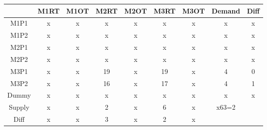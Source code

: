\documentclass{article}%
\begin{document}
\begin{tabular}{c|cc|c|ccccc}
    & M1RT & M1OT & M2RT & M2OT & M3RT & M3OT & Demand               & Diff                 \\
    \midrule
    M1P1   & x    & x    & x    & x    & x    & x    & x                    & x                    \\
    M1P2   & x    & x    & x    & x    & x    & x    & x                    & x                    \\
    M2P1   & x    & x    & x    & x    & x    & x    & x                    & x                    \\
    M2P2   & x    & x    & x    & x    & x    & x    & x                    & x                    \\
    M3P1   & x    & x    & 19   & x    & 19   & x    & 4                    & 0                    \\
    \cmidrule{2-9}
    M3P2   & x    & x    & 16   & x    & 17   & x    & 4                    & 1                    \\
    \cmidrule{2-9}
    Dummy  & x    & x    & x    & x    & x    & x    & x                    & x                    \\
    Supply & x    & x    & 2    & x    & 6    & x    & x63=2                &                      \\
    Diff   & x    & x    & 3    & x    & 2    & x    &                      &                      \\
\end{tabular}
\newline
\newline
\end{document}
